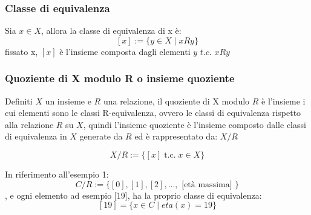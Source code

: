 \documentclass[a4paper,12pt]{article}
\newcommand{\rel}[1][R]{R}
\newcommand{\tc}{\;\text{t.c.}\;}
\begin{document}
	\subsubsection{Classe di equivalenza}
	Sia $x \in X$, allora la classe di equivalenza di x è:
	\[
	[x] := \{y \in X \mid x \rel y\}
	\]
	fissato x, $[x]$ è l'insieme composta dagli elementi $y$ $t.c.$ $x \rel y$
	
	\subsubsection{Quoziente di X modulo R o insieme quoziente}
	Definiti $X$ un insieme e $\rel$ una relazione, il quoziente di X modulo $\rel$ è l'insieme i cui elementi sono le classi R-equivalenza, ovvero le classi di equivalenza rispetto alla relazione $\rel$ su $X$, quindi l'insieme quoziente è l'insieme composto dalle classi di equivalenza in $X$ generate da $\rel$ ed è rappresentato da: $X/R$
	
	\[
	X/R := \{[x] \tc x \in X\}
	\]
	
	In riferimento all'esempio 1:
	\[
	C/R := \{[0], [1], [2], ... , \text{ [età massima] }\} %
	\], e ogni elemento ad esempio [19], ha la proprio classe di equivalenza:
	\[
	[19] = \{x \in C \mid eta(x) = 19\}
	\]
	
	\newpage
	
\end{document}
